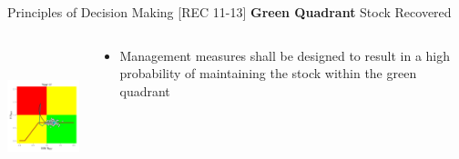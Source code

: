 \documentclass{beamer}
\newcommand\Fontviii{\fontsize{8}{10}\selectfont}
\begin{document}
\begin{frame}{Principles of Decision Making [REC 11-13]}
     \smallskip\textbf{Green Quadrant} Stock Recovered\smallskip\\
     \begin{columns}[t] %
     \begin{column}[T]{5cm} %
          \includegraphics[height=40mm]{hcrII12.png}
     \end{column}
     \begin{column}[T]{5cm} %
                  \Fontviii
                  \begin{itemize}
                  \item Management measures shall be designed to result in a high probability of maintaining the stock within the green quadrant
                 \end{itemize}        
     \end{column}
     \end{columns}    
\end{frame}




\end{document}
